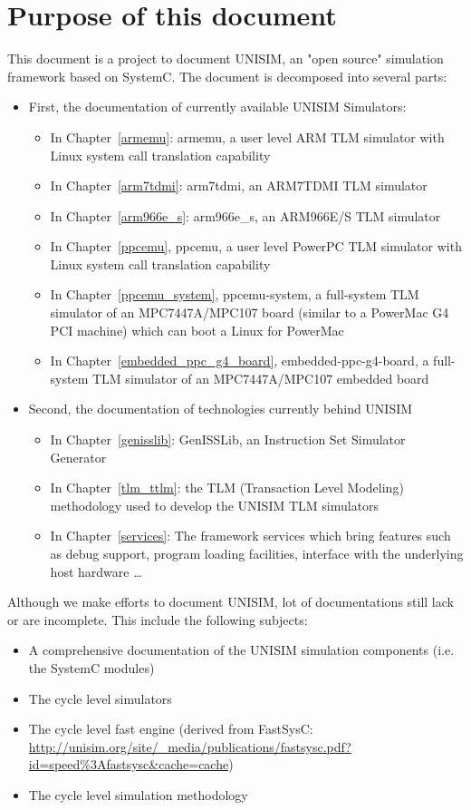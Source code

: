 \section{Purpose of this document}

This document is a project to document UNISIM, an "open source" simulation framework based on SystemC.
The document is decomposed into several parts:
\begin{itemize}
	\item First, the documentation of currently available UNISIM Simulators:
	\begin{itemize}
		\item In Chapter~\ref{armemu}: armemu, a user level ARM TLM simulator with Linux system call translation capability
		\item In Chapter~\ref{arm7tdmi}: arm7tdmi, an ARM7TDMI TLM simulator
		\item In Chapter~\ref{arm966e_s}: arm966e\_s, an ARM966E/S TLM simulator
		\item In Chapter~\ref{ppcemu}, ppcemu, a user level PowerPC TLM simulator with Linux system call translation capability
		\item In Chapter~\ref{ppcemu_system}, ppcemu-system, a full-system TLM simulator of an MPC7447A/MPC107 board (similar to a PowerMac G4 PCI machine) which can boot a Linux for PowerMac
		\item In Chapter~\ref{embedded_ppc_g4_board}, embedded-ppc-g4-board, a full-system TLM simulator of an MPC7447A/MPC107 embedded board
	\end{itemize}
	\item Second, the documentation of technologies currently behind UNISIM
	\begin{itemize}
		\item In Chapter~\ref{genisslib}: GenISSLib, an Instruction Set Simulator Generator
		\item In Chapter~\ref{tlm_ttlm}: the TLM (Transaction Level Modeling) methodology used to develop the UNISIM TLM simulators
		\item In Chapter~\ref{services}: The framework services which bring features such as debug support, program loading facilities, interface with the underlying host hardware \ldots
	\end{itemize}
\end{itemize}

Although we make efforts to document UNISIM, lot of documentations still lack or are incomplete. This include the following subjects:
\begin{itemize}
	\item A comprehensive documentation of the UNISIM simulation components (i.e. the SystemC modules)
	\item The cycle level simulators
	\item The cycle level fast engine (derived from FastSysC: \url{http://unisim.org/site/_media/publications/fastsysc.pdf?id=speed\%3Afastsysc&cache=cache})
	\item The cycle level simulation methodology
\end{itemize}

